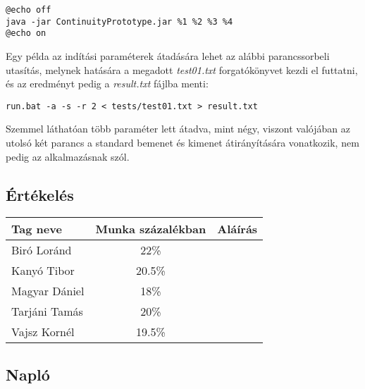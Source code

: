 \begin{verbatim}
@echo off
java -jar ContinuityPrototype.jar %1 %2 %3 %4
@echo on
\end{verbatim}

Egy példa az indítási paraméterek átadására lehet az alábbi parancssorbeli utasítás, melynek hatására a megadott \emph{test01.txt} forgatókönyvet kezdi el futtatni, és az eredményt pedig a \emph{result.txt} fájlba menti:

\begin{verbatim}
run.bat -a -s -r 2 < tests/test01.txt > result.txt
\end{verbatim}

Szemmel láthatóan több paraméter lett átadva, mint négy, viszont valójában az utolsó két parancs a standard bemenet és kimenet átirányítására vonatkozik, nem pedig az alkalmazásnak szól.


\subsection{Értékelés}
\begin{tabular}{|p{130pt}|c|p{150pt}|}
\hline 
\textbf{Tag neve} & \textbf{Munka százalékban} & \textbf{Aláírás}\\ 
\hline 
Biró Loránd & 22\% & \\ 
\hline 
Kanyó Tibor & 20.5\% & \\
\hline 
Magyar Dániel & 18\% & \\
\hline 
Tarjáni Tamás & 20\% & \\
\hline 
Vajsz Kornél & 19.5\% & \\
\hline 
\end{tabular} 
\newpage

\subsection{Napló}

\begin{journal}


\end{journal}

